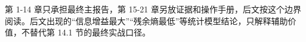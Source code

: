 第 1-14 章只承担最终主报告，第 15-21 章另放证据和操作手册，后文按这个边界阅读。后文出现的“信息增益最大”“残余熵最低”等统计模型结论，只解释辅助价值，不替代第 14.1 节的最终实战口径。

